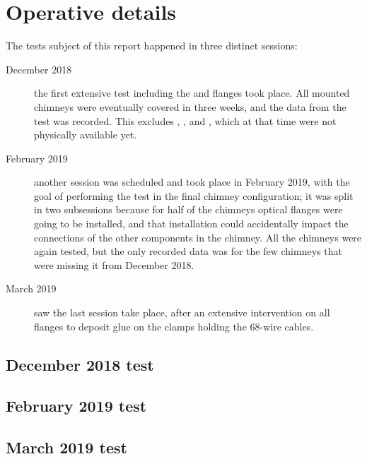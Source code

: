 \section{Operative details}
\label{sec:operations}


The tests subject of this report happened in three distinct sessions:
\begin{description}
  \item[December 2018] the first extensive test including the \DBB and flanges
    took place. All mounted chimneys were eventually covered in three weeks,
    and the data from the test was recorded.
    This excludes , ,  and
    , which at that time were not physically available yet.
  \item[February 2019] another session was scheduled and took place in February
    2019, with the goal of performing the test in the final chimney
    configuration; it was split in two subsessions because for half of the
    chimneys optical flanges were going to be installed, and that installation
    could accidentally impact the connections of the other components in the
    chimney. All the chimneys were again tested, but the only recorded data
    was for the few chimneys that were missing it from December 2018.
  \item[March 2019] saw the last session take place, after an extensive
    intervention on all flanges to deposit glue on the clamps holding the
    68-wire cables.
\end{description}


\subsection{December 2018 test}
\label{ssec:operations:December2018}




\subsection{February 2019 test}
\label{ssec:operations:February2019}




\subsection{March 2019 test}
\label{ssec:operations:March2019}


